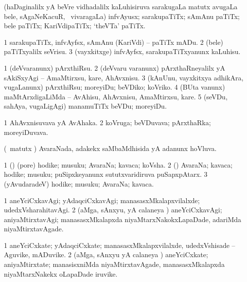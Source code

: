 \bentry
{}
\gl{\nA}
\bmng
(haDaginalilx yA beVre vidhadalilx kaLuhisiruva sarakugaLa matutx avugaLa bele, sAgaNeKacuR, \mo\ vivaragaLa) infvAyusx; sarakupaTiTx; sAmAnu paTiTx; bele paTiTx; KariVdipaTiTx; `theVTa' paTiTx. 
\emng
\eentry

\bentry
{}
\gl{\sakirx}
\bmng
\bnum
\num{1} sarakupaTiTx, infvAyfsx, sAmAnu (KariVdi) -- paTiTx mADu. 
\num{2} (bele) paTiTxyalilx seVrisu. 
\num{3} (vayxkitxge) infvAyfsx, sarakupaTiTxyanunx kaLuhisu. 
\enum
\emng
\eentry

\bentry
{}
\gl{\sakirx}
\bmng
\bnum
\num{1} (deVvaranunx) pArxthiRsu. 
\num{2} (deVvaru \mo varanunx) pArxthaRneyalilx yA sAkiSxyAgi -- AmaMtirxsu, kare, AhAvxnisu. 
\num{3} (kAnUnu, vayxkitxya adhikAra, \mo vugaLanunx) pArxthiRsu; moreyiDu; beVDiko; koVriko. 
\num{4} (BUta \mo vanunx) maMtArxdigaLiMda -- AvAhisu, AhAvxnisu, AmaMtirxsu, kare. 
\num{5} (seVDu, sahAya, \mo vugaLigAgi) manamuTiTx beVDu; moreyiDu. 
\enum
\emng
\eentry

\bentry
{}
\gl{\nA}
\bmng
\bnum
\num{1} AhAvxnisuvava yA AvAhaka. 
\num{2} koVruga; beVDuvava; pArxthaRka; moreyiDuvava. 
\enum
\emng
\eentry

\bentry
{}
\gl{\gu}
\bmng
(\aMrashA\ matutx \savi) AvaraNada, adakekx saMbaMdhisida yA adanunx hoVluva. 
\emng
\eentry

\bentry
{}
\gl{\nA}
\bmng
\bnum
\num{1} (\aMrashA) (pore) hodike; musuku; AvaraNa; kavaca; koVsha. 
\num{2} (\savi) AvaraNa; kavaca; hodike; musuku; puSipxkeyanunx sututxvaridiruva puSapxpAtarx.   
\num{3} (yAvudaradeV) hodike; musuku; AvaraNa; kavaca. 
\enum
\emng
\eentry

\bentry
{}
\gl{\kirxvi}
\bmng
\bnum
\num{1} aneYciCxkavAgi; yAdaqciCxkavAgi; manasasxMkalapxvilalxde; udedxVsharahitavAgi. 
\num{2} (aMga, sAnxyu, yA calaneya \vi) aneYciCxkavAgi; aniyaMtirxtavAgi; manasasxMkalapxda niyaMtarxNakokxLapaDade, adariMda niyaMtirxtavAgade. 
\enum
\emng
\eentry

\bentry
{}
\gl{\nA}
\bmng
\bnum
\num{1} aneYciCxkate; yAdaqciCxkate; manasasxMkalapxvilalxde, udedxVshisade -- Aguvike, mADuvike. 
\num{2} (aMga, sAnxyu yA calaneya \vi) aneYciCxkate; aniyaMtirxtate; manasisxniMda niyaMtirxtavAgade, manasasxMkalapxda niyaMtarxNakekx oLapaDade iruvike. 
\enum
\emng
\eentry

